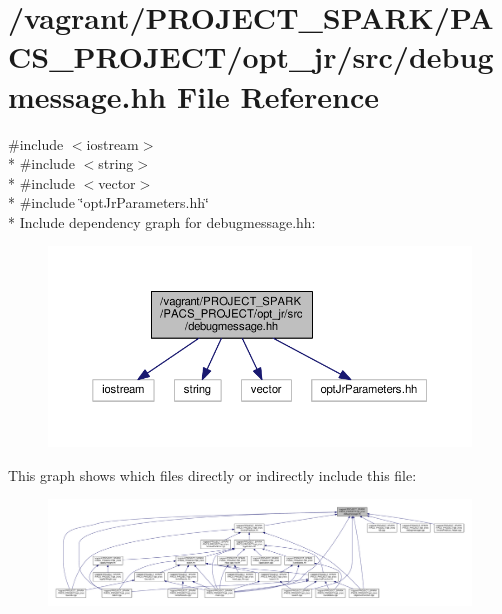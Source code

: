 \hypertarget{debugmessage_8hh}{\section{/vagrant/\-P\-R\-O\-J\-E\-C\-T\-\_\-\-S\-P\-A\-R\-K/\-P\-A\-C\-S\-\_\-\-P\-R\-O\-J\-E\-C\-T/opt\-\_\-jr/src/debugmessage.hh File Reference}
\label{debugmessage_8hh}
}
{\ttfamily \#include $<$iostream$>$}\\*
{\ttfamily \#include $<$string$>$}\\*
{\ttfamily \#include $<$vector$>$}\\*
{\ttfamily \#include \char`\"{}opt\-Jr\-Parameters.\-hh\char`\"{}}\\*
Include dependency graph for debugmessage.\-hh\-:\nopagebreak
\begin{figure}[H]
\begin{center}
\leavevmode
\includegraphics[width=350pt]{debugmessage_8hh__incl}
\end{center}
\end{figure}
This graph shows which files directly or indirectly include this file\-:
\nopagebreak
\begin{figure}[H]
\begin{center}
\leavevmode
\includegraphics[width=350pt]{debugmessage_8hh__dep__incl}
\end{center}
\end{figure}
